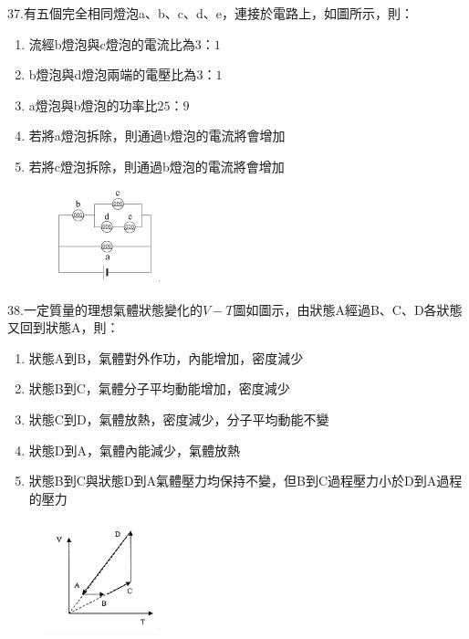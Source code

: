 \documentclass[cn,10pt,math=newtx,chinesefont=founder,device=ig]{elegantbook}
\begin{document}
\begin{example}
   37.有五個完全相同燈泡a、b、c、d、e，連接於電路上，如圖所示，則：
   \begin{enumerate}[label=(\Alph*)]
    \item 流經b燈泡與c燈泡的電流比為$3：1$
    \item b燈泡與d燈泡兩端的電壓比為$3：1$
    \item a燈泡與b燈泡的功率比$25：9$
    \item 若將a燈泡拆除，則通過b燈泡的電流將會增加
    \item 若將c燈泡拆除，則通過b燈泡的電流將會增加
   \end{enumerate}

    \rightline{[成德高中教甄109]}
\end{example}
\begin{solution}
    
\end{solution}
\begin{figure}[htbp]
    \flushright
    \includegraphics[width=0.3\textwidth]{image/109成德37.png}
  \end{figure}
\newpage


\begin{example}
   38.一定質量的理想氣體狀態變化的$V-T$圖如圖示，由狀態A經過B、C、D各狀態又回到狀態A，則：
   \begin{enumerate}[label=(\Alph*)]
     \item 狀態A到B，氣體對外作功，內能增加，密度減少
     \item 狀態B到C，氣體分子平均動能增加，密度減少
     \item 狀態C到D，氣體放熱，密度減少，分子平均動能不變
     \item 狀態D到A，氣體內能減少，氣體放熱
     \item 狀態B到C與狀態D到A氣體壓力均保持不變，但B到C過程壓力小於D到A過程的壓力
   \end{enumerate}

    \rightline{[成德高中教甄109]}
\end{example}
\begin{solution}
    
\end{solution}
\begin{figure}[htbp]
    \flushright
    \includegraphics[width=0.3\textwidth]{image/109成德38.png}
  \end{figure}
\newpage
\end{document}
